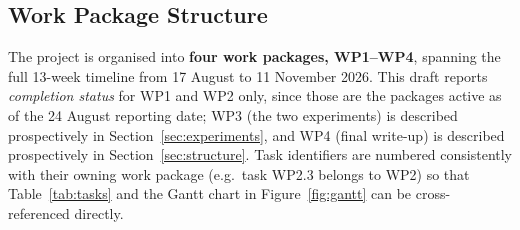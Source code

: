\documentclass[11pt,a4paper]{article}
\begin{document}


\subsection{Work Package Structure}
\label{sec:workpackages}
 
The project is organised into \textbf{four work packages, WP1--WP4}, spanning the full 13-week timeline from 17 August to 11 November 2026. This draft reports \emph{completion status} for WP1 and WP2 only, since those are the packages active as of the 24 August reporting date; WP3 (the two experiments) is described prospectively in Section~\ref{sec:experiments}, and WP4 (final write-up) is described prospectively in Section~\ref{sec:structure}. Task identifiers are numbered consistently with their owning work package (e.g.\ task WP2.3 belongs to WP2) so that Table~\ref{tab:tasks} and the Gantt chart in Figure~\ref{fig:gantt} can be cross-referenced directly.
 
\end{document}
